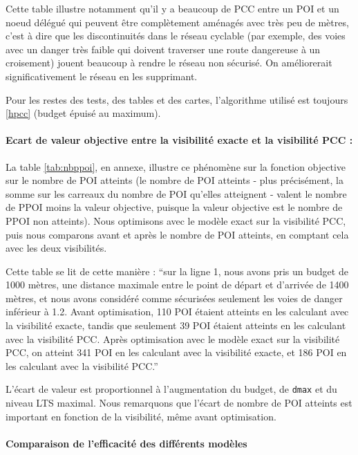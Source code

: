 Cette table illustre notamment qu'il y a beaucoup de PCC entre un POI et un noeud délégué qui peuvent être complètement aménagés avec très peu de mètres, c'est à dire que les discontinuités dans le réseau cyclable (par exemple, des voies avec un danger très faible qui doivent traverser une route dangereuse à un croisement) jouent beaucoup à rendre le réseau non sécurisé. On améliorerait significativement le réseau en les supprimant.

Pour les restes des tests, des tables et des cartes, l'algorithme utilisé est toujours \ref{hpcc} (budget épuisé au maximum).

\paragraph{Ecart de valeur objective entre la visibilité exacte et la visibilité PCC :}

La table \ref{tab:nbppoi}, en annexe, illustre ce phénomène sur la fonction objective sur le nombre de POI atteints (le nombre de POI atteints - plus précisément, la somme sur les carreaux du nombre de POI qu'elles atteignent - valent le nombre de PPOI moins la valeur objective, puisque la valeur objective est le nombre de PPOI non atteints). Nous optimisons avec le modèle exact sur la visibilité PCC, puis nous comparons avant et après le nombre de POI atteints, en comptant cela avec les deux visibilités.

Cette table se lit de cette manière : ``sur la ligne 1, nous avons pris un budget de 1000 mètres, une distance maximale entre le point de départ et d'arrivée de 1400 mètres, et nous avons considéré comme sécurisées seulement les voies de danger inférieur à 1.2. Avant optimisation, 110 POI étaient atteints en les calculant avec la visibilité exacte, tandis que seulement 39 POI étaient atteints en les calculant avec la visibilité PCC. Après optimisation avec le modèle exact sur la visibilité PCC, on atteint 341 POI en les calculant avec la visibilité exacte, et 186 POI en les calculant avec la visibilité PCC.'' 

L'écart de valeur est proportionnel à l'augmentation du budget, de \verb|dmax| et du niveau LTS maximal. Nous remarquons que l'écart de nombre de POI atteints est important en fonction de la visibilité, même avant optimisation.

\paragraph{Comparaison de l'efficacité des différents modèles}

